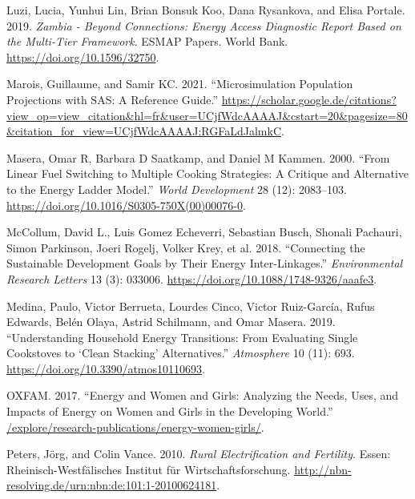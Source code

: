\documentclass[
]{article}
\newlength{\cslhangindent}
\newlength{\cslentryspacingunit} %
\newenvironment{CSLReferences}[2] %
 {%
  \setlength{\parindent}{0pt}
  \ifodd #1
  \let\oldpar\par
  \def\par{\hangindent=\cslhangindent\oldpar}
  \fi
  \setlength{\parskip}{#2\cslentryspacingunit}
 }%
 {}
\begin{document}
\begin{CSLReferences}{1}{0}
\leavevmode{}%
Luzi, Lucia, Yunhui Lin, Brian Bonsuk Koo, Dana Rysankova, and Elisa Portale. 2019. \emph{Zambia - {Beyond} {Connections}: {Energy} {Access} {Diagnostic} {Report} {Based} on the {Multi}-{Tier} {Framework}}. {ESMAP} Papers. World Bank. \url{https://doi.org/10.1596/32750}.

\leavevmode{}%
Marois, Guillaume, and Samir KC. 2021. {``‪{Microsimulation} {Population} {Projections} with {SAS}: {A} {Reference} {Guide}‬.''} \url{https://scholar.google.de/citations?view_op=view_citation\&hl=fr\&user=UCjfWdcAAAAJ\&cstart=20\&pagesize=80\&citation_for_view=UCjfWdcAAAAJ:RGFaLdJalmkC}.

\leavevmode{}%
Masera, Omar R, Barbara D Saatkamp, and Daniel M Kammen. 2000. {``From {Linear} {Fuel} {Switching} to {Multiple} {Cooking} {Strategies}: {A} {Critique} and {Alternative} to the {Energy} {Ladder} {Model}.''} \emph{World Development} 28 (12): 2083--103. \url{https://doi.org/10.1016/S0305-750X(00)00076-0}.

\leavevmode{}%
McCollum, David L., Luis Gomez Echeverri, Sebastian Busch, Shonali Pachauri, Simon Parkinson, Joeri Rogelj, Volker Krey, et al. 2018. {``Connecting the Sustainable Development Goals by Their Energy Inter-Linkages.''} \emph{Environmental Research Letters} 13 (3): 033006. \url{https://doi.org/10.1088/1748-9326/aaafe3}.

\leavevmode{}%
Medina, Paulo, Victor Berrueta, Lourdes Cinco, Victor Ruiz-García, Rufus Edwards, Belén Olaya, Astrid Schilmann, and Omar Masera. 2019. {``Understanding {Household} {Energy} {Transitions}: {From} {Evaluating} {Single} {Cookstoves} to {`{Clean} {Stacking}'} {Alternatives}.''} \emph{Atmosphere} 10 (11): 693. \url{https://doi.org/10.3390/atmos10110693}.

\leavevmode{}%
OXFAM. 2017. {``Energy and {Women} and {Girls}: {Analyzing} the Needs, Uses, and Impacts of Energy on Women and Girls in the Developing World.''} \href{https:///explore/research-publications/energy-women-girls/}{/explore/research-publications/energy-women-girls/}.

\leavevmode{}%
Peters, Jörg, and Colin Vance. 2010. \emph{Rural {Electrification} and {Fertility}}. Essen: Rheinisch-Westfälisches Institut für Wirtschaftsforschung. \url{http://nbn-resolving.de/urn:nbn:de:101:1-20100624181}.


\end{CSLReferences}
\end{document}
